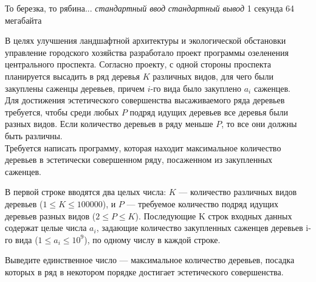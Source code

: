 \begin{problem}%
{То березка, то рябина...}%
{\textsl{стандартный ввод}}%
{\textsl{стандартный вывод}}%
{1 секунда}%
{64 мегабайта}{}

В целях улучшения ландшафтной архитектуры и экологической обстановки управление городского хозяйства разработало проект программы озеленения центрального проспекта. Согласно проекту, с одной стороны проспекта планируется высадить в ряд деревья $K$ различных видов, для чего были закуплены саженцы деревьев, причем $i$-го вида было закуплено $a_i$ саженцев.\\

Для достижения эстетического совершенства высаживаемого ряда деревьев требуется, чтобы среди любых $P$ подряд идущих деревьев все деревья были разных видов. Если количество деревьев в ряду меньше $P$, то все они должны быть различны.\\

Требуется написать программу, которая находит максимальное количество деревьев в эстетически совершенном ряду, посаженном из закупленных саженцев.

\InputFile

В первой строке вводятся два целых числа: $K$ — количество различных видов деревьев ($1 \le K \le 100 000$), и $P$ — требуемое количество подряд идущих деревьев разных видов ($2 \le P \le K$). Последующие K строк  входных данных содержат целые числа $a_i$, задающие количество закупленных саженцев деревьев i-го вида  ($1 \le a_i \le 10^9$), по одному числу в каждой строке.

\OutputFile

Выведите единственное число — максимальное количество деревьев, посадка которых в ряд в некотором порядке достигает эстетического совершенства.

\Examples

\begin{example}
%
\end{example}
\end{problem}
